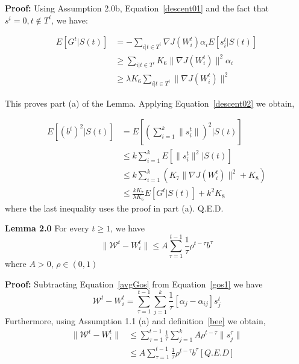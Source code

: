 \noindent \textbf{Proof:} Using Assumption 2.0b, Equation~\ref{descent01} and the fact that $s^i=0, t \notin T^i$, we have:

\begin{align*}
E[ G^t | S(t)] &= - \sum_{i|t \in T^i} \nabla J(W_i^t) \alpha_{i} E [s_i^t | S(t)] \\
            &\ge \sum_{i|t \in T^i} K_6 \parallel \nabla J(W_i^t) \parallel^2 \alpha_{i} \\
            &\ge \lambda K_6 \sum_{i|t \in T^i} \parallel \nabla J(W_i^t) \parallel^2
\end{align*}

\noindent This proves part (a) of the Lemma. Applying Equation~\ref{descent02} we obtain,

\begin{align*}
E[(b^t)^2 |  S(t)] &= E [(\sum_{i=1}^k \parallel s_i^t \parallel)^2|S(t)] \\
                   &\le k \sum_{i=1}^k E[\parallel s_i^t \parallel^2|S(t)] \\
                   &\le k \sum_{i=1}^k (K_7 \parallel \nabla J(W_i^{t}) \parallel^2 + K_8) \\
                   &\le \frac{k K_7}{\lambda K_6} E[ G^t | S(t)] + k^2 K_8
\end{align*}
where the last inequality uses the proof in part (a). Q.E.D.

\noindent \textbf{Lemma 2.0} For every $t \ge 1$, we have 
\begin{equation}
\parallel \mathcal{W}^t - W_i^t \parallel \le A \sum_{\tau=1}^{t-1} \frac{1}{\tau} \rho^{t-\tau}b^{\tau}
\end{equation}
\noindent where $A>0$, $\rho \in (0,1)$ 

\noindent \textbf{Proof: }Subtracting Equation~\ref{avgGos} from Equation~\ref{gos1} we have
\begin{equation}
 \mathcal{W}^t - W_i^t = \sum_{\tau=1}^{t-1} \sum_{j=1}^{k} \frac{1}{\tau} [\alpha_{j} - \alpha_{ij}] s_j^t 
\end{equation}
Furthermore, using Assumption 1.1 (a) and definition~\ref{bee} we obtain,
\begin{align*}
\parallel \mathcal{W}^t - W_i^t \parallel &\le \sum_{\tau=1}^{t-1} \frac{1}{\tau} \sum_{j=1}^{k} A \rho^{t-\tau} \parallel s_j^{\tau} \parallel \\
 & \le  A \sum_{\tau=1}^{t-1} \frac{1}{\tau}  \rho^{t-\tau}  b^{\tau} [Q.E.D]
\end{align*}

